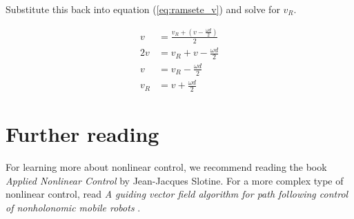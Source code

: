 Substitute this back into equation (\ref{eq:ramsete_v}) and solve for $v_R$.

\begin{align}
  v &= \frac{v_R + (v - \frac{\omega d}{2})}{2} \nonumber \\
  2v &= v_R + v - \frac{\omega d}{2} \nonumber \\
  v &= v_R - \frac{\omega d}{2} \nonumber \\
  v_R &= v + \frac{\omega d}{2}
\end{align}

\section{Further reading}

For learning more about nonlinear control, we recommend reading the book
\textit{Applied Nonlinear Control} by Jean-Jacques Slotine. For a more complex
type of nonlinear control, read \textit{A guiding vector field algorithm for
path following control of nonholonomic mobile robots} \cite{bib:gvf}.
